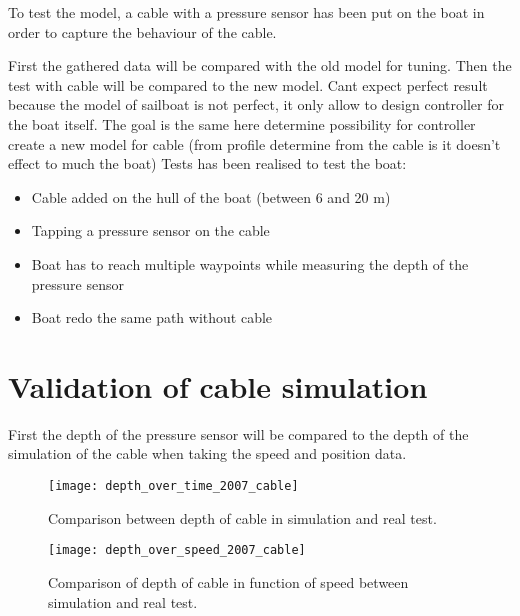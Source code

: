 To test the model, a cable with a pressure sensor has been put on the boat in order to capture the behaviour
of the cable.

First the gathered data will be compared with the old model for tuning. Then the test with cable will be compared to the new model.
Cant expect perfect result because the model of sailboat is not perfect, it only allow to design controller for the boat itself. The goal is the same here determine possibility for controller create a new model for cable (from profile determine from the cable is it doesn't effect to much the boat)
Tests has been realised to test the boat:

\begin{itemize}
\item Cable added on the hull of the boat (between 6 and 20 m)
\item Tapping a pressure sensor on the cable
\item Boat has to reach multiple waypoints while measuring the depth of the pressure sensor
\item Boat redo the same path without cable
\end{itemize}

\section{Validation of cable simulation}

First the depth of the pressure sensor will be compared to the depth of the simulation of the cable when taking the speed and position data.

\begin{figure}[H]
\centering
    \begin{minipage}[b]{0.4\textwidth}
    \centering
    \texttt{[image: depth\_over\_time\_2007\_cable]}
    \caption{Comparison between depth of cable in simulation and real test.}
    \label{fig:comp_depth_time_2007}
    \end{minipage}
    \hfill
    \begin{minipage}[b]{0.45\textwidth}
    \centering
    \texttt{[image: depth\_over\_speed\_2007\_cable]}
    \caption{Comparison of depth of cable in function of speed between simulation and real test.}
    \label{fig:comp_depth_speed_2007}
    \end{minipage}
\end{figure}



